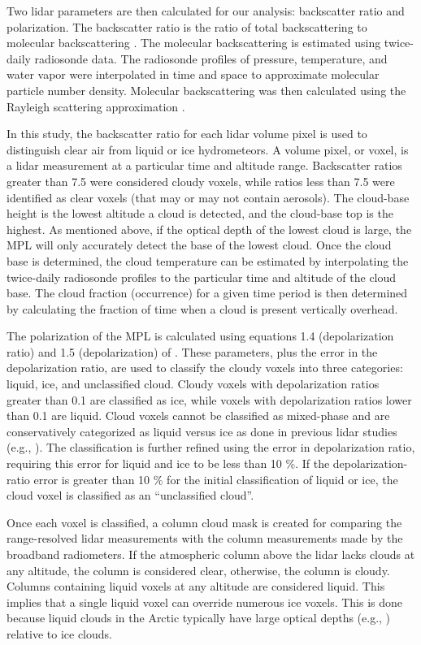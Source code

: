 Two lidar parameters are then calculated for our analysis: backscatter ratio and polarization. The backscatter ratio is the ratio of total backscattering to molecular backscattering \citep{klett:1981}. The molecular backscattering is estimated using twice-daily radiosonde data. The radiosonde profiles of pressure, temperature, and water vapor were interpolated in time and space to approximate molecular particle number density. Molecular backscattering was then calculated using the Rayleigh scattering approximation \citep{bohren:2006, bohren:2008, placzek:1934}. 

In this study, the backscatter ratio for each lidar volume pixel is used to distinguish clear air from liquid or ice hydrometeors. A volume pixel, or voxel, is a lidar measurement at a particular time and altitude range. Backscatter ratios greater than 7.5 were considered cloudy voxels, while ratios less than 7.5 were identified as clear voxels (that may or may not contain aerosols). The cloud-base height is the lowest altitude a cloud is detected, and the cloud-base top is the highest. As mentioned above, if the optical depth of the lowest cloud is large, the MPL will only accurately detect the base of the lowest cloud. Once the cloud base is determined, the cloud temperature can be estimated by interpolating the twice-daily radiosonde profiles to the particular time and altitude of the cloud base. The cloud fraction (occurrence) for a given time period is then determined by calculating the fraction of time when a cloud is present vertically overhead.

The polarization of the MPL is calculated using equations 1.4 (depolarization ratio) and 1.5 (depolarization) of \citet{flynn:2007}. These parameters, plus the error in the depolarization ratio, are used to classify the cloudy voxels into three categories: liquid, ice, and unclassified cloud. Cloudy voxels with depolarization ratios greater than 0.1 are classified as ice, while voxels with depolarization ratios lower than 0.1 are liquid. Cloud voxels cannot be classified as mixed-phase and are conservatively categorized as liquid versus ice as done in previous lidar studies (e.g., \citet{intrieri:2002}). The classification is further refined using the error in depolarization ratio, requiring this error for liquid and ice to be less than 10 $\%$. If the depolarization-ratio error is greater than 10 $\%$ for the initial classification of liquid or ice, the cloud voxel is classified as an “unclassified cloud”. 

Once each voxel is classified, a column cloud mask is created for comparing the range-resolved lidar measurements with the column measurements made by the broadband radiometers. If the atmospheric column above the lidar lacks clouds at any altitude, the column is considered clear, otherwise, the column is cloudy. Columns containing liquid voxels at any altitude are considered liquid. This implies that a single liquid voxel can override numerous ice voxels. This is done because liquid clouds in the Arctic typically have large optical depths (e.g., \citet{curry:1996}) relative to ice clouds.

